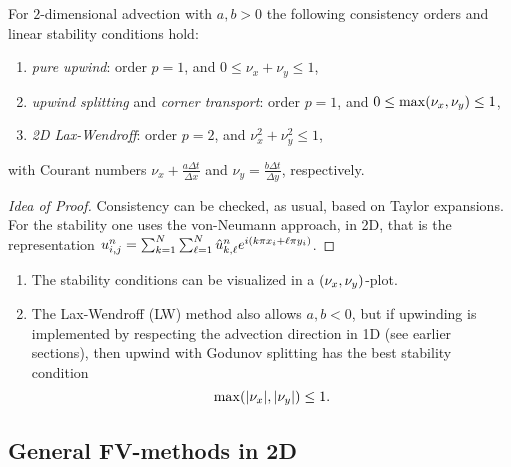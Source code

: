 \begin{theorem}
	For \(2\)-dimensional advection with \(a, b > 0\) the following consistency orders and linear stability conditions hold:
	\begin{enumerate}
		\item \emph{pure upwind}: order \(p = 1\), and \(0 \le \nu_x + \nu_y \le 1\),
		\item \emph{upwind splitting} and \emph{corner transport}: order \(p = 1\), and \(0 \le \max\parentheses*{\nu_x, \nu_y} \le 1\),
		\item \emph{2D Lax-Wendroff}: order \(p = 2\), and \(\nu_x^2 + \nu_y^2 \le 1\),
	\end{enumerate}
	with Courant numbers \(\nu_x + \frac{a\Delta t}{\Delta x}\) and \(\nu_y = \frac{b\Delta t}{\Delta y}\), respectively.
\end{theorem}

\begin{proof}[Idea of Proof]
	Consistency can be checked, as usual, based on Taylor expansions.
	For the stability one uses the von-Neumann approach, in 2D, that is the representation \(u_{i, j}^n = \sum_{k = 1}^N \sum_{\ell = 1}^N \hat{u}_{k, \ell}^n e^{i\parentheses*{k\pi x_i + \ell\pi y_i}}\).
\end{proof}

\begin{remark}
	\begin{enumerate}
		\item The stability conditions can be visualized in a \(\parentheses*{\nu_x, \nu_y}\)-plot.
		\begin{center}
		\end{center}
		\item The Lax-Wendroff (LW) method also allows \(a, b < 0\), but if upwinding is implemented by respecting the advection direction in 1D (see earlier sections), then upwind with Godunov splitting has the best stability condition
		\[
			\max\parentheses*{\absolute*{\nu_x}, \absolute*{\nu_y}} \le 1.
		\]
	\end{enumerate}
\end{remark}


\subsection{General FV-methods in 2D}

